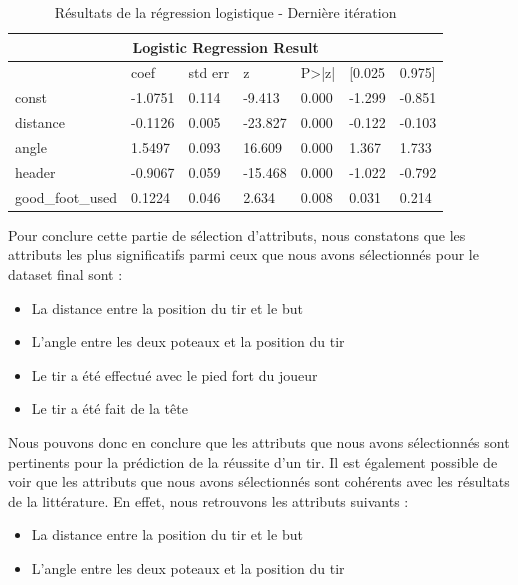 \documentclass[12pt]{article}
\begin{document}
\begin{table}[htp]
    \centering
    \begin{tabular}{lllllll}
    \multicolumn{7}{c}{\textbf{Logistic Regression Result}}                                   \\ \hline
                     & coef    & std err & z       & P\textgreater{}|z| & {[}0.025 & 0.975{]} \\ \hline
    const            & -1.0751 & 0.114   & -9.413  & 0.000              & -1.299   & -0.851   \\
    distance         & -0.1126 & 0.005   & -23.827 & 0.000              & -0.122   & -0.103   \\
    angle            & 1.5497  & 0.093   & 16.609  & 0.000              & 1.367    & 1.733    \\
    header           & -0.9067 & 0.059   & -15.468 & 0.000              & -1.022   & -0.792   \\
    good\_foot\_used & 0.1224  & 0.046   & 2.634   & 0.008              & 0.031    & 0.214    \\ \hline
    \end{tabular}
    \caption{Résultats de la régression logistique - Dernière itération}
    \label{tab:logistic_regression_result_6}
\end{table}
\newpage
Pour conclure cette partie de sélection d'attributs, nous constatons que les attributs les plus significatifs parmi ceux que nous avons sélectionnés pour le dataset final sont :
\begin{itemize}
    \item La distance entre la position du tir et le but
    \item L'angle entre les deux poteaux et la position du tir
    \item Le tir a été effectué avec le pied fort du joueur
    \item Le tir a été fait de la tête
\end{itemize}
Nous pouvons donc en conclure que les attributs que nous avons sélectionnés sont pertinents pour la prédiction de la réussite d'un tir. 
Il est également possible de voir que les attributs que nous avons sélectionnés sont cohérents avec les résultats de la littérature. 
En effet, nous retrouvons les attributs suivants :
\begin{itemize}
    \item La distance entre la position du tir et le but
    \item L'angle entre les deux poteaux et la position du tir
\end{itemize}
\end{document}
